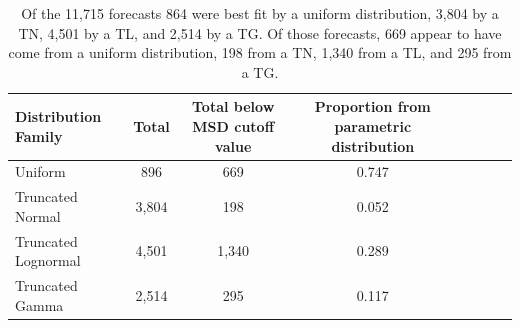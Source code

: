 \documentclass[11pt,notitlepage]{isuthesis}
\begin{document}
\begin{table}[h!]
  \centering
  \begin{tabular}{l*{6}{c}r}
  Distribution Family   & Total    & Total below MSD cutoff value 
  & Proportion from parametric distribution\\
  \hline
  Uniform               & 896      & 669  & 0.747  \\
  Truncated Normal      & 3,804    & 198  & 0.052  \\
  Truncated Lognormal   & 4,501    & 1,340 & 0.289 \\
  Truncated Gamma       & 2,514    & 295   & 0.117 \\
  \end{tabular}
  \begin{center}
\begin{minipage}{10cm}
\captionsetup{font=scriptsize}
  \caption[CDC flu retro analysis results]{Of the 11,715
forecasts 864 were best fit by a uniform distribution, 3,804 by a TN, 
4,501 by a TL, and 2,514 by a TG. Of those forecasts, 669 appear to have
come from a uniform distribution, 198 from a TN, 1,340 from a TL, and 295 from
a TG.
}
  \label{table:cdcresults}
  \end{minipage}
  \end{center}
\end{table}
\end{document}
